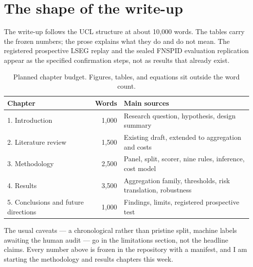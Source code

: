 \documentclass[11pt,a4paper]{article}
\begin{document}
\section*{The shape of the write-up}

The write-up follows the UCL structure at about 10{,}000 words. The tables carry the frozen numbers; the prose explains what they do and do not mean. The registered prospective LSEG replay and the sealed FNSPID evaluation replication appear as the specified confirmation steps, not as results that already exist.

\begin{table}[H]
\centering
\begin{tabularx}{\textwidth}{l r X}
\toprule
Chapter & Words & Main sources \\
\midrule
1. Introduction & 1{,}000 & Research question, hypothesis, design summary \\
2. Literature review & 1{,}500 & Existing draft, extended to aggregation and costs \\
3. Methodology & 2{,}500 & Panel, split, scorer, nine rules, inference, cost model \\
4. Results & 3{,}500 & Aggregation family, thresholds, risk translation, robustness \\
5. Conclusions and future directions & 1{,}000 & Findings, limits, registered prospective test \\
\bottomrule
\end{tabularx}
\caption{Planned chapter budget. Figures, tables, and equations sit outside the word count.}
\end{table}

The usual caveats --- a chronological rather than pristine split, machine labels awaiting the human audit --- go in the limitations section, not the headline claims. Every number above is frozen in the repository with a manifest, and I am starting the methodology and results chapters this week.
\end{document}
